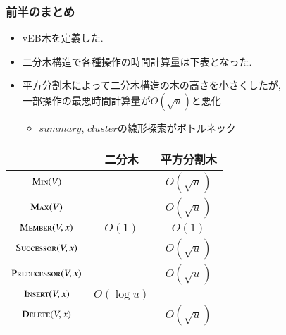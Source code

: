 \documentclass[main]{subfiles}
\begin{document}
\begin{frame}\frametitle{前半のまとめ}
	\begin{itemize}
		\item vEB木を定義した.
		\item 二分木構造で各種操作の時間計算量は下表となった.
		\item 平方分割木によって二分木構造の木の高さを小さくしたが, \\
			一部操作の最悪時間計算量が$O(\sqrt{u})$と悪化\\
			\begin{itemize}
				\item $summary$, $cluster$の線形探索がボトルネック
			\end{itemize}
	\end{itemize}
	\begin{table}
		\begin{tabular}{|c|c|c|}\hline
			& 二分木 & 平方分割木 \\\hline
			{\scriptsize $\mathrm{\text{M\textsc{in}}}(V)$ } 			& \structure{ $\Theta(\log u)$} 		& \alert{$O(\sqrt{u })$} \\
			{\scriptsize $\mathrm{\text{M\textsc{ax}}}(V)$ } 			& \structure{ $\Theta(\log u)$} 		& \alert{$O(\sqrt{u} )$} \\
			{\scriptsize $\mathrm{\text{M\textsc{ember}}}(V,x)$ } 		& $O(1)$ 					& $O(1)$ \\
			{\scriptsize $\mathrm{\text{S\textsc{uccessor}}}(V,x)$ } 	& \structure{ $O(\log u)$} 	& \alert{$O(\sqrt{u})$} \\
			{\scriptsize $\mathrm{\text{P\textsc{redecessor}}}(V,x)$ } 	& \structure{ $O(\log u)$}	& \alert{$O(\sqrt{u})$} \\
			{\scriptsize $\mathrm{\text{I\textsc{nsert}}}(V,x)$ } 		& \alert{$O(\log u)$}		& \structure{$O(1)$} \\
			{\scriptsize $\mathrm{\text{D\textsc{elete}}}(V,x)$ } 		& \structure{ $O(\log u)$}	& \alert{ $O(\sqrt{u})$} \\\hline
		\end{tabular}
	\end{table}
\end{frame}
\end{document}
